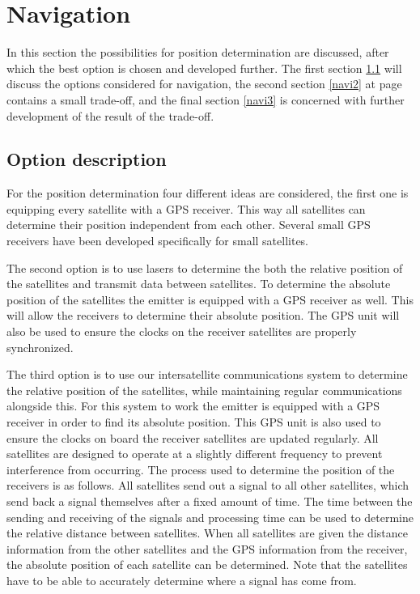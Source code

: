\section{Navigation}
\label{NaviEmitter}
In this section the possibilities for position determination are discussed, after which the best option is chosen and developed further. The first section \ref{navi1} will discuss the options considered for navigation, the second section \ref{navi2} at page contains a small trade-off, and the final section \ref{navi3} is concerned with further development of the result of the trade-off.

\subsection{Option description}
\label{navi1}
For the position determination four different ideas are considered, the first one is equipping every satellite with a \acs{GPS} receiver. This way all satellites can determine their position independent from each other. Several small \acs{GPS} receivers have been developed specifically for small satellites.

The second option is to use lasers to determine the both the relative position of the satellites and transmit data between satellites. To determine the absolute position of the satellites the emitter is equipped with a \acs{GPS} receiver as well. This will allow the receivers to determine their absolute position. The \acs{GPS} unit will also be used to ensure the clocks on the receiver satellites are properly synchronized.

The third option is to use our intersatellite communications system to determine the relative position of the satellites, while maintaining regular communications alongside this. For this system to work the emitter is equipped with a GPS receiver in order to find its absolute position. This GPS unit is also used to ensure the clocks on board the receiver satellites are updated regularly. All satellites are designed to operate at a slightly different frequency to prevent interference from occurring. 
The process used to determine the position of the receivers is as follows. All satellites send out a signal to all other satellites, which send back a signal themselves after a fixed amount of time. The time between the sending and receiving of the signals and processing time can be used to determine the relative distance between satellites. When all satellites are given the distance information from the other satellites and the GPS information from the receiver, the absolute position of each satellite can be determined. Note that the satellites have to be able to accurately determine where a signal has come from.

